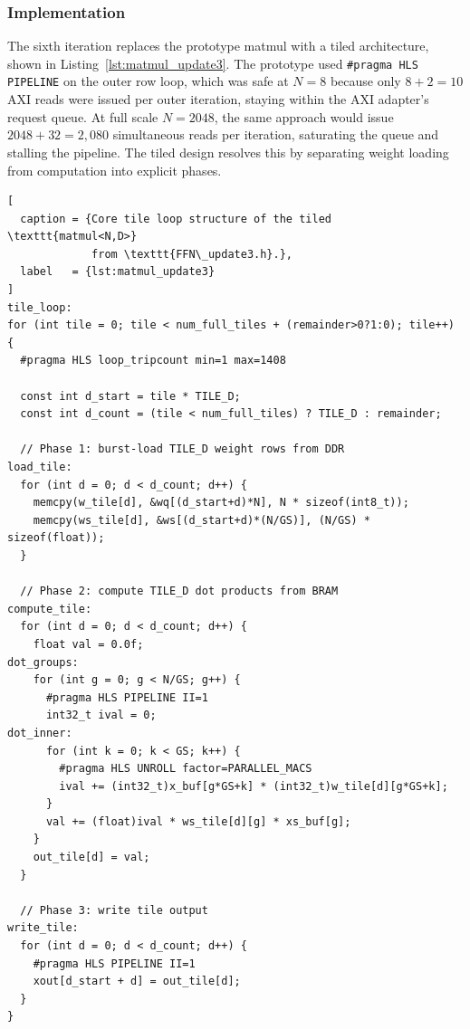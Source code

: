 \subsubsection{Implementation}
\label{subsubsec:matmul_update3_impl}

The sixth iteration replaces the prototype matmul with a tiled
architecture, shown in Listing~\ref{lst:matmul_update3}. The prototype
used \texttt{\#pragma HLS PIPELINE} on the outer row loop, which was safe
at $N = 8$ because only $8 + 2 = 10$ AXI reads were issued per outer
iteration, staying within the AXI adapter's request queue. At full scale
$N = 2048$, the same approach would issue $2048 + 32 = 2{,}080$ simultaneous
reads per iteration, saturating the queue and stalling the pipeline. The
tiled design resolves this by separating weight loading from computation
into explicit phases.

\begin{lstlisting}[
  caption = {Core tile loop structure of the tiled \texttt{matmul<N,D>}
             from \texttt{FFN\_update3.h}.},
  label   = {lst:matmul_update3}
]
tile_loop:
for (int tile = 0; tile < num_full_tiles + (remainder>0?1:0); tile++) {
  #pragma HLS loop_tripcount min=1 max=1408

  const int d_start = tile * TILE_D;
  const int d_count = (tile < num_full_tiles) ? TILE_D : remainder;

  // Phase 1: burst-load TILE_D weight rows from DDR
load_tile:
  for (int d = 0; d < d_count; d++) {
    memcpy(w_tile[d], &wq[(d_start+d)*N], N * sizeof(int8_t));
    memcpy(ws_tile[d], &ws[(d_start+d)*(N/GS)], (N/GS) * sizeof(float));
  }

  // Phase 2: compute TILE_D dot products from BRAM
compute_tile:
  for (int d = 0; d < d_count; d++) {
    float val = 0.0f;
dot_groups:
    for (int g = 0; g < N/GS; g++) {
      #pragma HLS PIPELINE II=1
      int32_t ival = 0;
dot_inner:
      for (int k = 0; k < GS; k++) {
        #pragma HLS UNROLL factor=PARALLEL_MACS
        ival += (int32_t)x_buf[g*GS+k] * (int32_t)w_tile[d][g*GS+k];
      }
      val += (float)ival * ws_tile[d][g] * xs_buf[g];
    }
    out_tile[d] = val;
  }

  // Phase 3: write tile output
write_tile:
  for (int d = 0; d < d_count; d++) {
    #pragma HLS PIPELINE II=1
    xout[d_start + d] = out_tile[d];
  }
}
\end{lstlisting}

